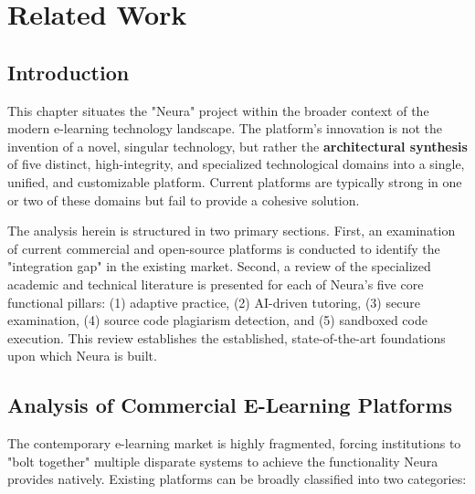 \chapter{Related Work}

\section{Introduction}

This chapter situates the "Neura" project within the broader context of the modern e-learning technology landscape. The platform's innovation is not the invention of a novel, singular technology, but rather the \textbf{architectural synthesis} of five distinct, high-integrity, and specialized technological domains into a single, unified, and customizable platform. Current platforms are typically strong in one or two of these domains but fail to provide a cohesive solution.

The analysis herein is structured in two primary sections. First, an examination of current commercial and open-source platforms is conducted to identify the "integration gap" in the existing market. Second, a review of the specialized academic and technical literature is presented for each of Neura's five core functional pillars: (1) adaptive practice, (2) AI-driven tutoring, (3) secure examination, (4) source code plagiarism detection, and (5) sandboxed code execution. This review establishes the established, state-of-the-art foundations upon which Neura is built.

\section{Analysis of Commercial E-Learning Platforms}

The contemporary e-learning market is highly fragmented, forcing institutions to "bolt together" multiple disparate systems to achieve the functionality Neura provides natively. Existing platforms can be broadly classified into two categories:

